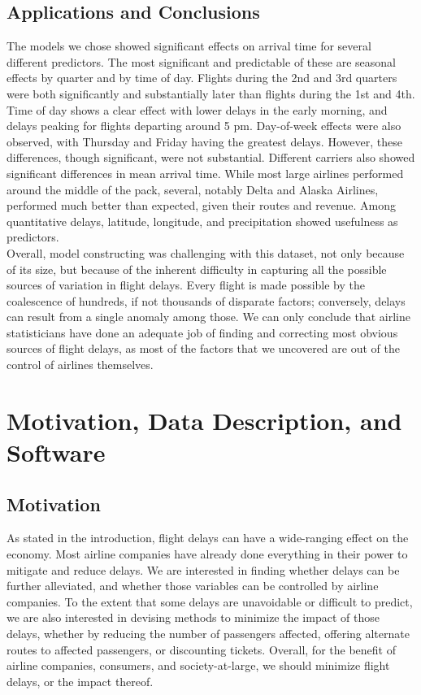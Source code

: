 \documentclass[12pt, a4paper, openany]{book}
\newcommand\tab[1][1cm]{\hspace*{#1}}
\begin{document}
	\section{Applications and Conclusions}
\tab The models we chose showed significant effects on arrival time for several different predictors. The most significant and predictable of these are seasonal effects by quarter and by time of day. Flights during the 2nd and 3rd quarters were both significantly and substantially later than flights during the 1st and 4th. Time of day shows a clear effect with lower delays in the early morning, and delays peaking for flights departing around 5 pm. Day-of-week effects were also observed, with Thursday and Friday having the greatest delays. However, these differences, though significant, were not substantial. Different carriers also showed significant differences in mean arrival time. While most large airlines performed around the middle of the pack, several, notably Delta and Alaska Airlines, performed much better than expected, given their routes and revenue. Among quantitative delays, latitude, longitude, and precipitation showed usefulness as predictors.\\
\tab Overall, model constructing was challenging with this dataset, not only because of its size, but because of the inherent difficulty in capturing all the possible sources of variation in flight delays. Every flight is made possible by the coalescence of hundreds, if not thousands of disparate factors; conversely, delays can result from a single anomaly among those. We can only conclude that airline statisticians have done an adequate job of finding and correcting most obvious sources of flight delays, as most of the factors that we uncovered are out of the control of airlines themselves. 
\chapter{Motivation, Data Description, and Software}
	\section{Motivation}
	\tab As stated in the introduction, flight delays can have a wide-ranging effect on the economy. Most airline companies have already done everything in their power to mitigate and reduce delays. We are interested in finding whether delays can be further alleviated, and whether those variables can be controlled by airline companies. To the extent that some delays are unavoidable or difficult to predict, we are also interested in devising methods to minimize the impact of those delays, whether by reducing the number of passengers affected, offering alternate routes to affected passengers, or discounting tickets. Overall, for the benefit of airline companies, consumers, and society-at-large, we should minimize flight delays, or the impact thereof. 
\end{document}

